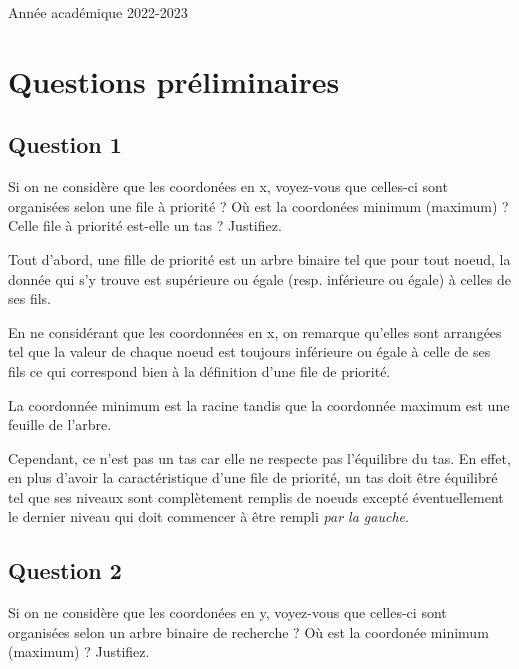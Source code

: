 \documentclass{article}
\begin{document}
\begin{titlepage}
\begin{center}
        {\large Année académique 2022-2023}
        
    \end{center}
\end{titlepage}

\newpage

\tableofcontents

\newpage

\section{Questions préliminaires}

\subsection{Question 1} Si on ne considère que les coordonées en x, voyez-vous
que celles-ci sont organisées selon une file à priorité ? Où est la coordonées minimum (maximum) ?
Celle file à priorité est-elle un tas ? Justifiez.

\bigskip

Tout d'abord, une fille de priorité est un arbre binaire tel que pour tout noeud, la donnée qui s'y trouve est supérieure ou
égale (resp. inférieure ou égale) à celles de ses fils. 

En ne considérant que les coordonnées en x, on remarque qu'elles sont arrangées tel que la valeur de chaque noeud est toujours inférieure ou égale
à celle de ses fils ce qui correspond bien à la définition d'une file de priorité. 

\medskip

La coordonnée minimum est la racine tandis que la coordonnée maximum est une feuille de l'arbre.

\medskip

Cependant, ce n'est pas un tas car elle ne respecte pas l'équilibre du tas. 
En effet, en plus d'avoir la caractéristique d'une file de priorité, un tas doit être équilibré tel que
ses niveaux sont complètement remplis de noeuds excepté éventuellement le dernier niveau qui doit commencer à être rempli \emph{par la gauche}.

\bigskip


\subsection{Question 2} Si on ne considère que les coordonées en y, voyez-vous 
que celles-ci sont organisées selon un arbre binaire de recherche ? Où est la coordonée minimum (maximum) ? Justifiez.
\end{document}
